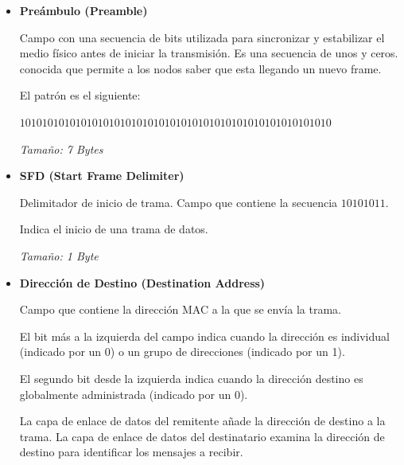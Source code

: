 \documentclass[12pt, fleqn]{report}                             %
\theoremstyle{break}                                            %
\newcommand{\Color}[2]{\textcolor{#1}{#2}}                      %
\begin{document}
                \begin{itemize}
                    
                    \item 
                        \textbf{Preámbulo (Preamble)} 

                            Campo con una secuencia de bits utilizada para sincronizar y
                            estabilizar el medio físico antes de iniciar la transmisión.
                            Es una secuencia de unos y ceros. conocida que permite a los
                            nodos saber que esta llegando un nuevo frame.

                            El patrón es el siguiente:

                            \Color{Blue900MD}{$10101010 10101010 10101010 10101010 10101010 10101010 10101010$} 

                            \emph{Tamaño: 7 Bytes} 

                    \item
                        \textbf{SFD (Start Frame Delimiter)} 

                            Delimitador de inicio de trama. Campo que contiene la
                            secuencia \Color{Red700MD}{$10101011$}.

                            Indica el inicio de una trama de datos.

                            \emph{Tamaño: 1 Byte} 

                    \item
                        \textbf{Dirección de Destino (Destination Address)}
 
                            Campo que contiene la dirección MAC a la que se envía la trama.

                            El bit más a la izquierda del campo indica cuando la dirección es individual (indicado por un 0)
                            o un grupo de direcciones (indicado por un 1).

                            El segundo bit desde la izquierda indica cuando la dirección destino es globalmente administrada
                            (indicado por un 0). 

                            La capa de enlace de datos del remitente añade la dirección de destino a la trama.
                            La capa de enlace de datos del destinatario examina la dirección de destino para identificar
                            los mensajes a recibir. 


\end{itemize}
\end{document}
